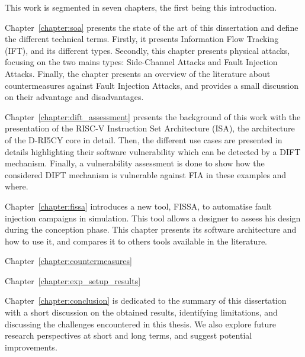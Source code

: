 This work is segmented in seven chapters, the first being this introduction.

Chapter~\ref{chapter:soa} presents the state of the art of this dissertation and define the different technical terms. Firstly, it presents Information Flow Tracking (IFT), and its different types.
Secondly, this chapter presents physical attacks, focusing on the two mains types: Side-Channel Attacks and Fault Injection Attacks.
Finally, the chapter presents an overview of the literature about countermeasures against Fault Injection Attacks, and provides a small discussion on their advantage and disadvantages.

Chapter~\ref{chapter:dift_assessment} presents the background of this work with the presentation of the RISC-V Instruction Set Architecture (ISA), the architecture of the D-RI5CY core in detail. Then, the different use cases are presented in details highlighting their software vulnerability which can be detected by a DIFT mechanism. Finally, a vulnerability assessment is done to show how the considered DIFT mechanism is vulnerable against FIA in these examples and where.

Chapter~\ref{chapter:fissa} introduces a new tool, FISSA, to automatise fault injection campaigns in simulation. This tool allows a designer to assess his design during the conception phase. This chapter presents its software architecture and how to use it, and compares it to others tools available in the literature.

Chapter~\ref{chapter:countermeasures}  %

Chapter~\ref{chapter:exp_setup_results} 

Chapter~\ref{chapter:conclusion} is dedicated to the summary of this dissertation with a short discussion on the obtained results, identifying limitations, and discussing the challenges encountered in this thesis.
We also explore future research perspectives at short and long terms, and suggest potential improvements.



